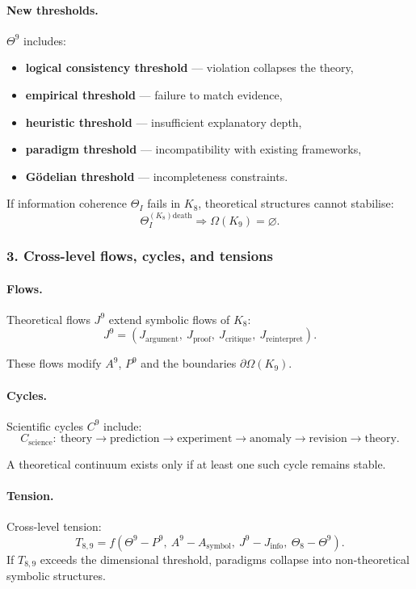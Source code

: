 \paragraph{New thresholds.}
$\Theta^9$ includes:
\begin{itemize}
  \item \textbf{logical consistency threshold} — violation collapses the theory,
  \item \textbf{empirical threshold} — failure to match evidence,
  \item \textbf{heuristic threshold} — insufficient explanatory depth,
  \item \textbf{paradigm threshold} — incompatibility with existing frameworks,
  \item \textbf{Gödelian threshold} — incompleteness constraints.
\end{itemize}

If information coherence $\Theta_I$ fails in $K_8$, theoretical structures
cannot stabilise:
\[
\Theta_I^{(K_8)\mathrm{death}} \Rightarrow \Omega(K_9)=\varnothing.
\]

\subsubsection{3. Cross-level flows, cycles, and tensions}

\paragraph{Flows.}
Theoretical flows $J^9$ extend symbolic flows of $K_8$:
\[
J^9 = (J_{\mathrm{argument}},\ J_{\mathrm{proof}},\
       J_{\mathrm{critique}},\ J_{\mathrm{reinterpret}}).
\]

These flows modify $A^9$, $P^9$ and the boundaries $\partial\Omega(K_9)$.

\paragraph{Cycles.}
Scientific cycles $C^9$ include:
\[
C_{\mathrm{science}}:\
\text{theory} \rightarrow \text{prediction} \rightarrow \text{experiment}
\rightarrow \text{anomaly} \rightarrow \text{revision} \rightarrow \text{theory}.
\]

A theoretical continuum exists only if at least one such cycle remains stable.

\paragraph{Tension.}
Cross-level tension:
\[
T_{8,9} =
f(\Theta^9 - P^9,\ A^9 - A_{\mathrm{symbol}},\
  J^9 - J_{\mathrm{info}},\ \Theta_8 - \Theta^9).
\]
If $T_{8,9}$ exceeds the dimensional threshold, paradigms collapse into
non-theoretical symbolic structures.

